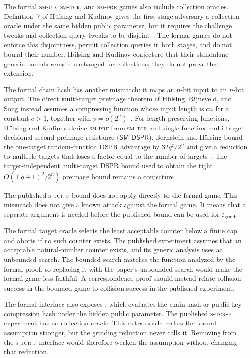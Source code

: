 \documentclass[11pt,a4paper]{article}
\theoremstyle{plain}
\theoremstyle{definition}
\DeclareRobustCommand{\coq}[1]{\texttt{\detokenize{#1}}}
\newcommand{\smud}{\textsc{sm-ud}\xspace}
\newcommand{\smtcr}{\textsc{sm-tcr}\xspace}
\newcommand{\smpre}{\textsc{sm-pre}\xspace}
\newcommand{\stcrp}{\textsc{s-tcr-p}\xspace}
\newcommand{\epsgr}{\varepsilon_{\mathsf{grind}}}
\begin{document}
The formal \smud, \smtcr, and \smpre games also include collection oracles.
Definition~7 of H\"ulsing and Kudinov gives the first-stage adversary a collection oracle under the same hidden public parameter, but it requires the challenge tweaks and collection-query tweaks to be disjoint~\cite{HulsingKudinov2022}.
The formal games do not enforce this disjointness, permit collection queries in both stages, and do not bound their number.
H\"ulsing and Kudinov conjecture that their standalone generic bounds remain unchanged for collections; they do not prove that extension.

The formal chain hash has another mismatch: it maps an \(n\)-bit input to an \(n\)-bit output.
The direct multi-target preimage theorem of H\"ulsing, Rijneveld, and Song instead assumes a compressing function whose input length is \(cn\) for a constant \(c>1\), together with \(p=o(2^n)\)~\cite{HulsingRijneveldSong2016}.
For length-preserving functions, H\"ulsing and Kudinov derive \smpre from \smtcr and single-function multi-target decisional second-preimage resistance (\(\mathsf{SM\text{-}DSPR}\)).
Bernstein and H\"ulsing bound the one-target random-function DSPR advantage by \(32q^2/2^n\) and give a reduction to multiple targets that loses a factor equal to the number of targets~\cite[Theorems~30 and~33]{BernsteinHulsing2019DSPR}.
The target-independent multi-target DSPR bound used to obtain the tight \(O((q+1)^2/2^n)\) preimage bound remains a conjecture~\cite{BernsteinEtAl2019Sphincs,HulsingKudinov2022}.

The published \stcrp bound does not apply directly to the formal game.
This mismatch does not give a known attack against the formal game.
It means that a separate argument is needed before the published bound can be used for \(\epsgr\).

The formal target oracle selects the least acceptable counter below a finite cap and aborts if no such counter exists.
The published experiment assumes that an acceptable natural-number counter exists, and its generic analysis uses an unbounded search.
The bounded search matches the function analyzed by the formal proof, so replacing it with the paper's unbounded search would make the formal game less faithful.
A correspondence proof should instead relate collision success in the bounded game to collision success in the published experiment.

The formal interface also exposes \coq{SCOLLQ}, which evaluates the chain hash or public-key-compression hash under the hidden public parameter.
The published \stcrp experiment has no collection oracle.
This extra oracle makes the formal assumption stronger, but the grinding reduction \coq{R_grind} never calls it.
Removing \coq{SCOLLQ} from the \stcrp interface would therefore weaken the assumption without changing that reduction.
\end{document}
